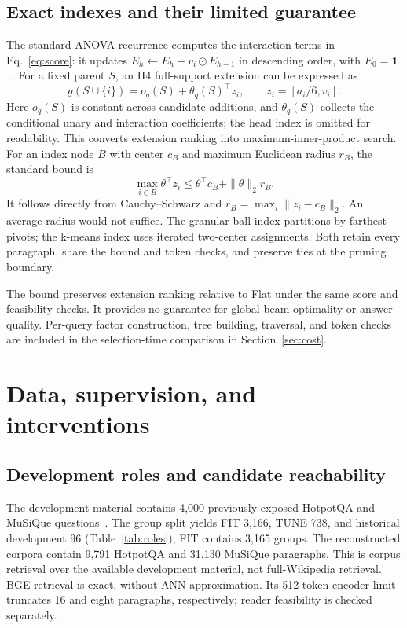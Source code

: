 \documentclass[preprint,12pt]{elsarticle}
\begin{document}
\subsection{Exact indexes and their limited guarantee}
The standard ANOVA recurrence computes the interaction terms in Eq.~\ref{eq:score}: it updates $E_h\leftarrow E_h+v_i\odot E_{h-1}$ in descending order, with $E_0=\mathbf1$~\cite{blondel2016hofm}. For a fixed parent $S$, an H4 full-support extension can be expressed as
\begin{equation}
g(S\cup\{i\})=o_q(S)+\theta_q(S)^\top z_i,
\qquad z_i=[a_i/6,v_i].
\end{equation}
Here $o_q(S)$ is constant across candidate additions, and $\theta_q(S)$ collects the conditional unary and interaction coefficients; the head index is omitted for readability. This converts extension ranking into maximum-inner-product search. For an index node $B$ with center $c_B$ and maximum Euclidean radius $r_B$, the standard bound is
\begin{equation}\label{eq:bound}
\max_{i\in B}\theta^\top z_i\leq\theta^\top c_B+\|\theta\|_2r_B.
\end{equation}
It follows directly from Cauchy--Schwarz and $r_B=\max_i\|z_i-c_B\|_2$. An average radius would not suffice. The granular-ball index partitions by farthest pivots; the k-means index uses iterated two-center assignments. Both retain every paragraph, share the bound and token checks, and preserve ties at the pruning boundary.

The bound preserves extension ranking relative to Flat under the same score and feasibility checks. It provides no guarantee for global beam optimality or answer quality. Per-query factor construction, tree building, traversal, and token checks are included in the selection-time comparison in Section~\ref{sec:cost}.

\section{Data, supervision, and interventions}\label{sec:data}
\subsection{Development roles and candidate reachability}
The development material contains 4,000 previously exposed HotpotQA and MuSiQue questions~\cite{yang2018hotpotqa,trivedi2022musique}. The group split yields FIT 3,166, TUNE 738, and historical development 96 (Table~\ref{tab:roles}); FIT contains 3,165 groups. The reconstructed corpora contain 9,791 HotpotQA and 31,130 MuSiQue paragraphs. This is corpus retrieval over the available development material, not full-Wikipedia retrieval. BGE retrieval is exact, without ANN approximation. Its 512-token encoder limit truncates 16 and eight paragraphs, respectively; reader feasibility is checked separately.
\end{document}
